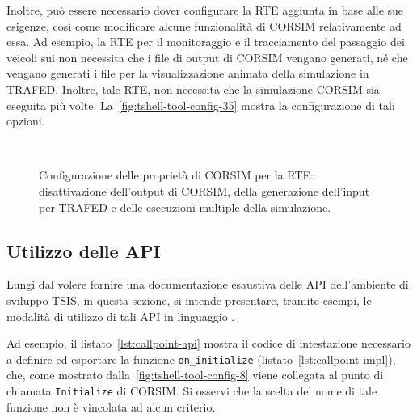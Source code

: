 Inoltre, può essere necessario dover configurare la \acs{RTE} aggiunta in base alle sue esigenze, così come modificare alcune funzionalità di \acs{CORSIM} relativamente ad essa. Ad esempio, la \acs{RTE} per il monitoraggio e il tracciamento del passaggio dei veicoli sui  non necessita che i file di output di \acs{CORSIM} vengano generati, né che vengano generati i file per la visualizzazione animata della simulazione in \acs{TRAFED}. Inoltre, tale \acs{RTE}, non necessita che la simulazione \acs{CORSIM} sia eseguita più volte. La~\vref{fig:tshell-tool-config-35} mostra la configurazione di tali opzioni.
\begin{figure}[H]
    \centering
     \\
    \caption[Configurazione delle proprietà di \acs{CORSIM}]{Configurazione delle proprietà di \acs{CORSIM} per la \acs{RTE}: disattivazione dell'output di \acs{CORSIM}, della generazione dell'input per \acs{TRAFED} e delle esecuzioni multiple della simulazione.}
    \label{fig:tshell-tool-config-35}
\end{figure}

\cleardoublepage
\subsection{Utilizzo delle API}\label{subsec:tsis-api-examples}
Lungi dal volere fornire una documentazione esaustiva delle \acs{API} dell'ambiente di sviluppo \acs{TSIS}, in questa sezione, si intende presentare, tramite esempi, le modalità di utilizzo di tali \acs{API} in linguaggio \CC{}.

Ad esempio, il listato~\ref{lst:callpoint-api} mostra il codice di intestazione necessario a definire ed esportare la funzione \lstinline[]|on_initialize| (listato~\ref{lst:callpoint-impl}), che, come mostrato dalla~\vref{fig:tshell-tool-config-8} viene collegata al punto di chiamata \lstinline[]|Initialize| di \acs{CORSIM}. Si osservi che la scelta del nome di tale funzione non è vincolata ad alcun criterio.

\vspace*{8pt}

